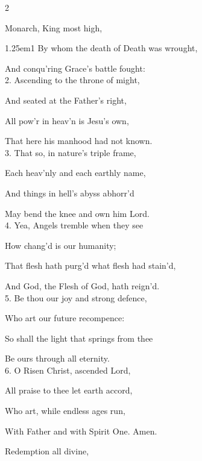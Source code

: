 \clearpage
\begin{paracol}{2}
\sloppy

\mattinsInvitatoryHymn\label{AscensionInvitatoryHymn}
 Monarch, King most high,

\begin{hangparas}{1.25em}{1}
By whom the death of Death was wrought,

And conqu'ring Grace's battle fought:\\

2. Ascending to the throne of might,

And seated at the Father's right,

All pow'r in heav’n is Jesu's own,

That here his manhood had not known.\\

3. That so, in nature's triple frame,

Each heav’nly and each earthly name,

And things in hell's abyss abhorr'd

May bend the knee and own him Lord.\\

4. Yea, Angels tremble when they see

How chang'd is our humanity;

That flesh hath purg'd what flesh had stain'd,

And God, the Flesh of God, hath reign'd.\\

5. Be thou our joy and strong defence,

Who art our future recompence:

So shall the light that springs from thee

Be ours through all eternity.\\

6. O Risen Christ, ascended Lord,

All praise to thee let earth accord,

Who art, while endless ages run,

With Father and with Spirit One. Amen.
\end{hangparas}

\switchcolumn

\mattinsOfficeHymn\label{AscensionMattinsHymn}

 Redemption all divine,


\end{paracol}

